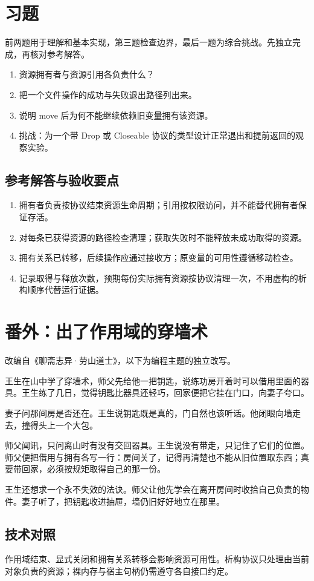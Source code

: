 \section{习题}

前两题用于理解和基本实现，第三题检查边界，最后一题为综合挑战。先独立完成，再核对参考解答。

\begin{enumerate}

\item 资源拥有者与资源引用各负责什么？

\item 把一个文件操作的成功与失败退出路径列出来。

\item 说明 move 后为何不能继续依赖旧变量拥有该资源。

\item 挑战：为一个带 Drop 或 Closeable 协议的类型设计正常退出和提前返回的观察实验。

\end{enumerate}

\subsection*{参考解答与验收要点}

\begin{enumerate}

\item 拥有者负责按协议结束资源生命周期；引用按权限访问，并不能替代拥有者保证存活。

\item 对每条已获得资源的路径检查清理；获取失败时不能释放未成功取得的资源。

\item 拥有关系已转移，后续操作应通过接收方；原变量的可用性遵循移动检查。

\item 记录取得与释放次数，预期每份实际拥有资源按协议清理一次，不用虚构的析构顺序代替运行证据。

\end{enumerate}

\section{番外：出了作用域的穿墙术}

改编自《聊斋志异·劳山道士》，以下为编程主题的独立改写。

王生在山中学了穿墙术，师父先给他一把钥匙，说练功房开着时可以借用里面的器具。王生练了几日，觉得钥匙比器具还轻巧，回家便把它挂在门口，向妻子夸口。

妻子问那间房是否还在。王生说钥匙既是真的，门自然也该听话。他闭眼向墙走去，撞得头上一个大包。

师父闻讯，只问离山时有没有交回器具。王生说没有带走，只记住了它们的位置。师父便把借用与拥有各写一行：房间关了，记得再清楚也不能从旧位置取东西；真要带回家，必须按规矩取得自己的那一份。

王生还想求一个永不失效的法诀。师父让他先学会在离开房间时收拾自己负责的物件。妻子听了，把钥匙收进抽屉，墙仍旧好好地立在那里。

\subsection*{技术对照}

作用域结束、显式关闭和拥有关系转移会影响资源可用性。析构协议只处理由当前对象负责的资源；裸内存与宿主句柄仍需遵守各自接口约定。
